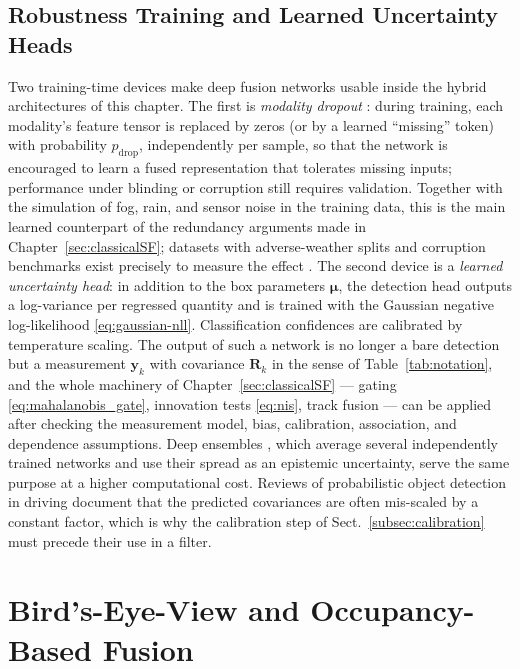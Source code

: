 \subsection{Robustness Training and Learned Uncertainty Heads}
\label{subsec:robustness-uncertainty-heads}
Two training-time devices make deep fusion networks usable inside the hybrid architectures of this chapter. The first is \emph{modality dropout} \cite{neverova2016_moddrop}: during training, each modality's feature tensor is replaced by zeros (or by a learned ``missing'' token) with probability $p_{\mathrm{drop}}$, independently per sample, so that the network is encouraged to learn a fused representation that tolerates missing inputs; performance under blinding or corruption still requires validation. Together with the simulation of fog, rain, and sensor noise in the training data, this is the main learned counterpart of the redundancy arguments made in Chapter~\ref{sec:classicalSF}; datasets with adverse-weather splits and corruption benchmarks exist precisely to measure the effect \cite{bijelic2020_stf,dong2023_robobev}. The second device is a \emph{learned uncertainty head}: in addition to the box parameters $\boldsymbol{\mu}$, the detection head outputs a log-variance per regressed quantity and is trained with the Gaussian negative log-likelihood \eqref{eq:gaussian-nll}. Classification confidences are calibrated by temperature scaling. The output of such a network is no longer a bare detection but a measurement $\mathbf{y}_k$ with covariance $\mathbf{R}_k$ in the sense of Table~\ref{tab:notation}, and the whole machinery of Chapter~\ref{sec:classicalSF} --- gating \eqref{eq:mahalanobis_gate}, innovation tests \eqref{eq:nis}, track fusion --- can be applied after checking the measurement model, bias, calibration, association, and dependence assumptions. Deep ensembles \cite{lakshminarayanan2017_ensembles}, which average several independently trained networks and use their spread as an epistemic uncertainty, serve the same purpose at a higher computational cost. Reviews of probabilistic object detection in driving \cite{feng2021_probabilistic_od} document that the predicted covariances are often mis-scaled by a constant factor, which is why the calibration step of Sect.~\ref{subsec:calibration} must precede their use in a filter.

\section{Bird's-Eye-View and Occupancy-Based Fusion}

